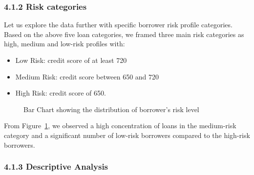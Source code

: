 \documentclass[
  letterpaper,
  DIV=11,
  numbers=noendperiod]{scrartcl}
\begin{document}
\subsubsection{4.1.2 Risk categories}\label{risk-categories}

Let us explore the data further with specific borrower risk profile
categories. Based on the above five loan categories, we framed three
main risk categories as high, medium and low-risk profiles with:

\begin{itemize}
\item
  Low Risk: credit score of at least 720
\item
  Medium Risk: credit score between 650 and 720
\item
  High Risk: credit score of 650.
\end{itemize}

\begin{figure}


\caption{\label{fig-risk_dist}Bar Chart showing the distribution of
borrower's risk level}

\end{figure}%

From Figure~\ref{fig-risk_dist}, we observed a high concentration of
loans in the medium-risk category and a significant number of low-risk
borrowers compared to the high-risk borrowers.

\newpage

\subsubsection{4.1.3 Descriptive Analysis}\label{descriptive-analysis}
\end{document}
